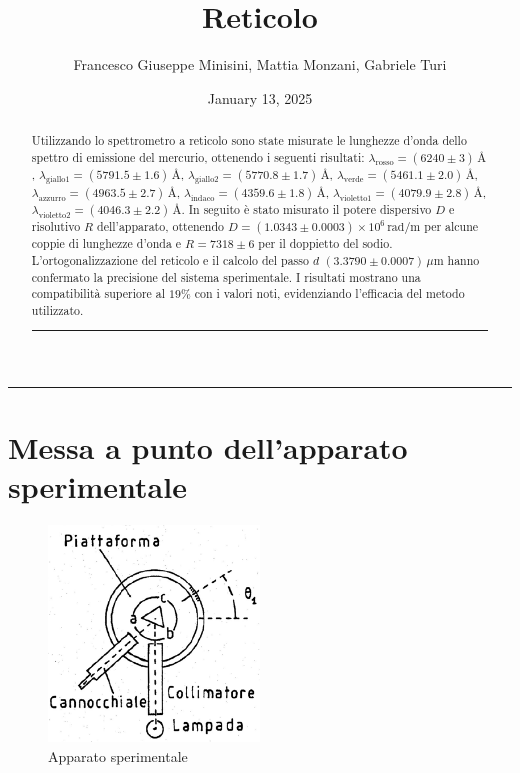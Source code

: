 \documentclass[a4paper,12pt]{article}
\title{Reticolo}
\author{Francesco Giuseppe Minisini, Mattia Monzani, Gabriele Turi}
\date{January 13, 2025}
\begin{document}
\maketitle
\hrule
\vspace{9pt}
\begin{abstract}
    \noindent
    Utilizzando lo spettrometro a reticolo sono state misurate le lunghezze d’onda dello spettro di emissione del mercurio, ottenendo i seguenti risultati: \( \lambda_{\text{rosso}} = (6240 \pm 3) \, \text{\AA} \), \( \lambda_{\text{giallo1}} = (5791.5 \pm 1.6) \, \text{\AA} \), \( \lambda_{\text{giallo2}} = (5770.8 \pm 1.7) \, \text{\AA} \), \( \lambda_{\text{verde}} = (5461.1 \pm 2.0) \, \text{\AA} \), \( \lambda_{\text{azzurro}} = (4963.5 \pm 2.7) \, \text{\AA} \), \( \lambda_{\text{indaco}} = (4359.6 \pm 1.8) \, \text{\AA} \), \( \lambda_{\text{violetto1}} = (4079.9 \pm 2.8) \, \text{\AA} \), \( \lambda_{\text{violetto2}} = (4046.3 \pm 2.2) \, \text{\AA} \). 
    In seguito è stato misurato il potere dispersivo \( D \) e risolutivo \( R \) dell’apparato, ottenendo \( D = (1.0343 \pm 0.0003) \times 10^6 \, \text{rad/m} \) per alcune coppie di lunghezze d'onda e \( R = 7318 \pm 6 \) per il doppietto del sodio. L'ortogonalizzazione del reticolo e il calcolo del passo \( d \) \((3.3790 \pm 0.0007) \, \mu\text{m}\) hanno confermato la precisione del sistema sperimentale. I risultati mostrano una compatibilità superiore al \(19\%\) con i valori noti, evidenziando l'efficacia del metodo utilizzato.
\vspace{20pt}
\hrule
\end{abstract}
\vspace{2 pt}


\section{Messa a punto dell'apparato sperimentale}

\begin{figure}[H]
    \centering
    \includegraphics[width=0.5\textwidth]{apparato.png}
    \caption{Apparato sperimentale}
    \label{fig:camera_millikan}
\end{figure}
\end{document}
